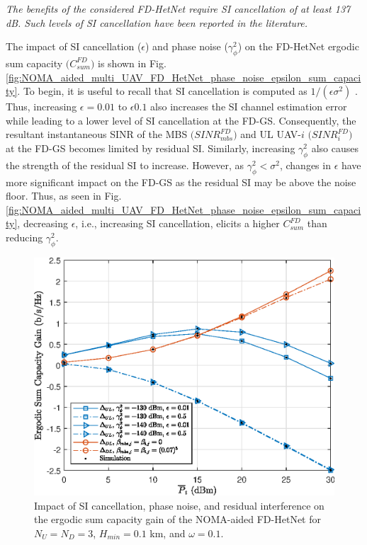 \begin{observation}
\emph{\emph{The benefits of the considered FD-HetNet require SI cancellation of at least 137 dB. Such levels of SI cancellation have been reported in the literature.}}
\end{observation}

The impact of SI cancellation ($\epsilon$) and phase noise ($\gamma_{\phi}^2$) on the FD-HetNet ergodic sum capacity $\big(C_{sum}^{FD}\big)$ is shown in Fig. \ref{fig:NOMA_aided_multi_UAV_FD_HetNet_phase_noise_epsilon_sum_capacity}. To begin, it is useful to recall that SI cancellation is computed as $1/(\epsilon \sigma^2)$ \cite{ernest2019outage,zlatanov2017capacity}. Thus, increasing $\epsilon=0.01$ to $\epsilon 0.1$ also increases the SI channel estimation error while leading to a lower level of SI cancellation at the FD-GS. Consequently, the resultant instantaneous SINR of the MBS $\big(SINR_{mbs}^{FD}\big)$ and UL UAV-$i$ $\big(SINR_{i}^{FD}\big)$ at the FD-GS becomes limited by residual SI. Similarly, increasing $\gamma_{\phi}^2$ also causes the strength of the residual SI to increase. However, as $\gamma_{\phi}^2 < \sigma^2$, changes in $\epsilon$ have more significant impact on the FD-GS as the residual SI may be above the noise floor. Thus, as seen in Fig. \ref{fig:NOMA_aided_multi_UAV_FD_HetNet_phase_noise_epsilon_sum_capacity}, decreasing $\epsilon$, i.e., increasing SI cancellation, elicits a higher $C_{sum}^{FD}$ than reducing $\gamma_{\phi}^2$.

\begin{figure}[th]
\centering \vspace{0.1cm}
\includegraphics [width=0.45\columnwidth]{chap7_fig/ergodic_capacity_gain.eps} 
\caption{Impact of SI cancellation, phase noise, and residual interference on the ergodic sum capacity gain of the NOMA-aided FD-HetNet for $N_U = N_D = 3$, $H_{min} = 0.1$ km, and $\omega = 0.1$.}
\label{fig:NOMA_aided_multi_UAV_FD_HetNet_phase_noise_epsilon_residual_interference_sum_capacity}
\end{figure}

